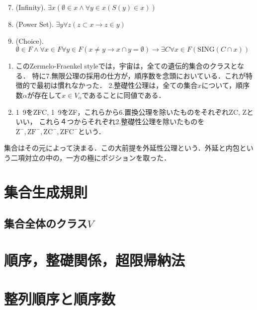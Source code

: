 \documentclass[uplatex, 12pt, dvipdfmx]{jsreport}
\begin{document}
\begin{shadebox}
\begin{definition}[集合の公理系ZF]
\begin{screen}
\begin{notation}
            \end{notation}
        \end{screen}
        \begin{enumerate}\setcounter{enumi}{6}
            \item (Infinity). $\exists x(\emptyset\in x\land \forall y\in x(S(y)\in x))$
            \item (Power Set). $\exists y\forall z(z\subset x\rightarrow z\in y)$
            \item (Choice). $\emptyset\in F\land\forall x\in F\forall y\in F(x\ne y\rightarrow x\cap y=\emptyset)\rightarrow \exists C\forall x\in F(\mathrm{SING}(C\cap x))$
        \end{enumerate}
    \end{definition}
\end{shadebox}
\begin{remark}\mbox{}
    \begin{enumerate}
        \item このZermelo-Fraenkel styleでは，宇宙は，全ての遺伝的集合のクラスとなる．
        特に7.無限公理の採用の仕方が，順序数を念頭においている．これが特徴的で最初は慣れなかった．
        2.整礎性公理は，全ての集合$x$について，順序数$\alpha$が存在して$x\in V_\alpha$であることに同値である．
        \item 1~9をZFC, 1~9をZF，これらから6.置換公理を除いたものをそれぞれZC, Zといい，
        これら４つからそれぞれ2.整礎性公理を除いたものを$\mathrm{Z^-,ZF^-,ZC^-,ZFC^-}$という．
    \end{enumerate} 
\end{remark}

集合はその元によって決まる．この大前提を外延性公理という．外延と内包という二項対立の中の，一方の極にポジションを取った．

\section{集合生成規則}

\subsection{集合全体のクラス$V$}

\section{順序，整礎関係，超限帰納法}

\section{整列順序と順序数}
\end{document}
